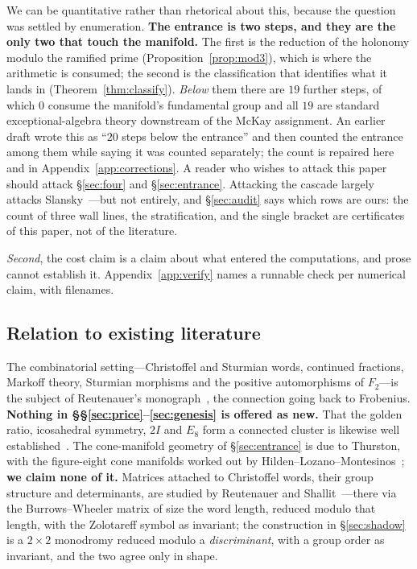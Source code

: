 \documentclass[11pt,reqno]{amsart}
\theoremstyle{plain}
\theoremstyle{definition}
\theoremstyle{remark}
\begin{document}
We can be quantitative rather than rhetorical about this, because the question was
settled by enumeration. \textbf{The entrance is two steps, and they are the only two
that touch the manifold.} The first is the reduction of the holonomy modulo the ramified
prime (Proposition~\ref{prop:mod3}), which is where the arithmetic is consumed; the
second is the classification that identifies what it lands
in (Theorem~\ref{thm:classify}). \emph{Below} them there are $19$ further steps, of
which $0$ consume the manifold's fundamental group and all $19$ are standard
exceptional-algebra theory downstream of the McKay assignment. An earlier draft wrote
this as ``$20$ steps below the entrance'' and then counted the entrance among them while
saying it was counted separately; the count is repaired here and in
Appendix~\ref{app:corrections}. A reader who wishes
to attack this paper should attack \S\ref{sec:four} and \S\ref{sec:entrance}. Attacking
the cascade largely attacks Slansky~\cite{Slansky}---but not entirely, and \S\ref{sec:audit}
says which rows are ours: the count of three wall lines, the stratification, and the
single bracket are certificates of this paper, not of the literature.

\emph{Second}, the cost claim is a claim about what entered the computations, and prose
cannot establish it. Appendix~\ref{app:verify} names a runnable check per numerical
claim, with filenames.

\subsection{Relation to existing literature}
The combinatorial setting---Christoffel and Sturmian words, continued fractions,
Markoff theory, Sturmian morphisms and the positive automorphisms of $F_2$---is the
subject of Reutenauer's monograph~\cite{Reutenauer}, the connection going back to
Frobenius. \textbf{Nothing in \S\S\ref{sec:price}--\ref{sec:genesis} is offered as
new.} That the golden ratio, icosahedral symmetry, $2I$ and $E_8$ form a connected
cluster is likewise well established~\cite{Baez,Dechant}. The cone-manifold geometry of
\S\ref{sec:entrance} is due to Thurston, with the figure-eight cone manifolds worked
out by Hilden--Lozano--Montesinos~\cite{HLM95}; \textbf{we claim none of it.} Matrices
attached to Christoffel words, their group structure and determinants, are studied by
Reutenauer and Shallit~\cite{ChristoffelMatrices}---there via the Burrows--Wheeler
matrix of size the word length, reduced modulo that length, with the Zolotareff symbol
as invariant; the construction in \S\ref{sec:shadow} is a $2\times2$ monodromy reduced
modulo a \emph{discriminant}, with a group order as invariant, and the two agree only
in shape.
\end{document}
